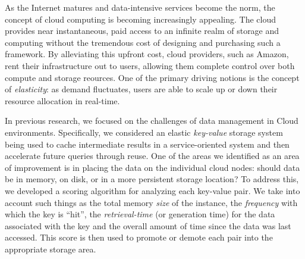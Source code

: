 As the Internet matures and data-intensive services become the norm, the
concept of cloud computing is becoming increasingly appealing. The cloud
provides near instantaneous, paid access to an infinite realm of storage and
computing without the tremendous cost of designing and purchasing such a
framework. By alleviating this upfront cost, cloud providers, such as Amazon,
rent their infrastructure out to users, allowing them complete control over
both compute and storage reources. One of the primary driving notions is the
concept of \emph{elasticity}: as demand fluctuates, users are able to scale up
or down their resource allocation in real-time.

In previous research, we focused on the challenges of data management in Cloud
environments. Specifically, we considered an elastic \emph{key-value} storage
system being used to cache intermediate results in a service-oriented system
and then accelerate future queries through reuse. One of the areas we
identified as an area of improvement is in placing the data on the individual
cloud nodes: should data be in memory, on disk, or in a more persistent storage
location? To address this, we developed a scoring algorithm for analyzing each
key-value pair. We take into account such things as the total memory
\emph{size} of the instance, the \emph{frequency} with which the key is
``hit'', the \emph{retrieval-time} (or generation time) for the data associated
with the key and the overall amount of time since the data was last accessed.
This score is then used to promote or demote each pair into the appropriate
storage area.
